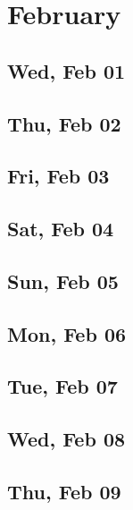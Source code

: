 \chapter{February}
	\section{Wed, Feb 01}
		
		
	\section{Thu, Feb 02}
		
		
	\section{Fri, Feb 03}
		
		
	\section{Sat, Feb 04}
		
		
	\section{Sun, Feb 05}
		
		
	\section{Mon, Feb 06}
		
		
	\section{Tue, Feb 07}
		
		
	\section{Wed, Feb 08}
		
		
	\section{Thu, Feb 09}
		
		

